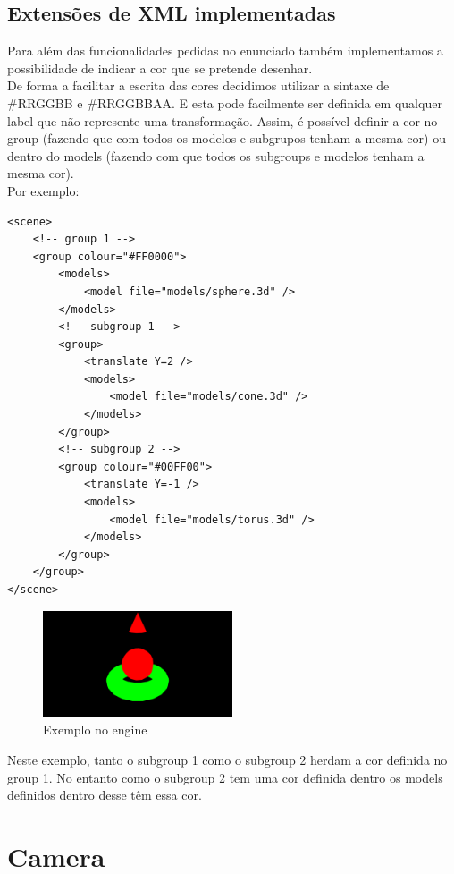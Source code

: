 \documentclass[a4paper]{report}
\begin{document}
\subsection{Extensões de XML implementadas}
Para além das funcionalidades pedidas no enunciado também implementamos a
possibilidade de indicar a cor que se pretende desenhar.\\
De forma a facilitar a escrita das cores decidimos utilizar a sintaxe de
\#RRGGBB
e \#RRGGBBAA. E esta pode facilmente ser definida em qualquer label que não
represente uma transformação. Assim, é possível definir a cor no group (fazendo
que com todos os modelos e subgrupos tenham a mesma cor) ou dentro do models
(fazendo com que todos os subgroups e modelos tenham a mesma cor).\\
Por exemplo:
\begin{lstlisting}
<scene>
    <!-- group 1 -->
    <group colour="#FF0000">
        <models>
            <model file="models/sphere.3d" />
        </models>
        <!-- subgroup 1 -->
        <group>
            <translate Y=2 />
            <models>
                <model file="models/cone.3d" />
            </models>
        </group>
        <!-- subgroup 2 -->
        <group colour="#00FF00">
            <translate Y=-1 />
            <models>
                <model file="models/torus.3d" />
            </models>
        </group>
    </group>
</scene>
\end{lstlisting}
\begin{figure}[H]
    \centering 
    \includegraphics[width=0.5\textwidth]{images/example.png}
    \caption{Exemplo no engine}
    \label{fig:scheme_torus}
\end{figure}
Neste exemplo, tanto o subgroup 1 como o subgroup 2 herdam a cor definida no
group 1. No entanto como o subgroup 2 tem uma cor definida dentro os models
definidos dentro desse têm essa cor.

\section{Camera}
\end{document}

